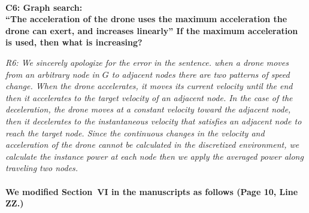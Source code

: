 \documentclass[onecolumn]{IEEEconf}
\begin{document}
\begin{description}
\begin{mdframed}[ linewidth=.75pt, userdefinedwidth=0.9\textwidth]
    \end{mdframed} 
    ~\\
    \item \textbf
    {
	C6: Graph search: \\
	``The acceleration of the drone uses the maximum acceleration the drone can exert, and increases linearly'' If the maximum acceleration is used, then what is increasing?	
	}
	\item \textit
	{
	R6: We sincerely apologize for the error in the sentence. when a drone moves from an arbitrary node in $G$ to adjacent nodes there are two patterns of speed change. When the drone accelerates, it moves its current velocity until the end then it accelerates to the target velocity of an adjacent node. 
    In the case of the deceleration, the drone moves at a constant velocity toward the adjacent node, then it decelerates to the instantaneous velocity that satisfies an adjacent node to reach the target node.
    Since the continuous changes in the velocity and acceleration of the drone cannot be calculated in the discretized environment, we calculate the instance power at each node then we apply the averaged power along traveling two nodes.
	}
	~\\
	~\\
	\textbf{We modified Section~VI in the manuscripts as follows (Page 10, Line ZZ.)}\\
    \begin{mdframed}[ linewidth=.75pt, userdefinedwidth=0.9\textwidth]

\end{mdframed}
\end{description}
\end{document}
